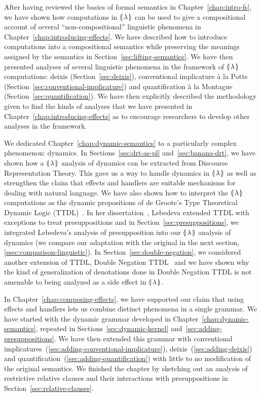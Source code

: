 After having reviewed the basics of formal semantics in
Chapter~\ref{chap:intro-fs}, we have shown how computations in ${\llparenthesis \, \lambda \, \rrparenthesis}$ can
be used to give a compositional account of several ``non-compositional''
linguistic phenomena in Chapter~\ref{chap:introducing-effects}. We have
described how to introduce computations into a compositional semantics
while preserving the meanings assigned by the semantics in
Section~\ref{sec:lifting-semantics}. We have then presented analyses of
several linguistic phenomena in the framework of ${\llparenthesis \, \lambda \, \rrparenthesis}$ computations:
deixis (Section~\ref{sec:deixis}), conventional implicature à la Potts
(Section~\ref{sec:conventional-implicature}) and quantification à la
Montague (Section~\ref{sec:quantification}). We have then explicitly
described the methodology given to find the kinds of analyses that we have
presented in Chapter~\ref{chap:introducing-effects} as to encourage
researchers to develop other analyses in the framework.

We dedicated Chapter~\ref{chap:dynamic-semantics} to a particularly complex
phenomenon: dynamics. In Sections~\ref{sec:drt-as-pl}
and~\ref{sec:banana-drt}, we have shown how a ${\llparenthesis \, \lambda \, \rrparenthesis}$ analysis of dynamics
can be extracted from Discourse Representation Theory. This gave us a way
to handle dynamics in ${\llparenthesis \, \lambda \, \rrparenthesis}$ as well as strengthen the claim that effects
and handlers are suitable mechanisms for dealing with natural language. We
have also shown how to interpret the ${\llparenthesis \, \lambda \, \rrparenthesis}$ computations as the dynamic
propositions of de Groote's Type Theoretical Dynamic Logic
(TTDL)~\cite{de2006towards}. In her
dissertation~\cite{lebedeva2012expression}, Lebedeva extended TTDL with
exceptions to treat presuppositions and in
Section~\ref{sec:presuppositions}, we integrated Lebedeva's analysis of
presupposition into our ${\llparenthesis \, \lambda \, \rrparenthesis}$ analysis of dynamics (we compare our
adaptation with the original in the next section,
\ref{ssec:comparison-linguistic}). In Section~\ref{sec:double-negation}, we
considered another extension of TTDL, Double Negation
TTDL~\cite{qian2014accessibility} and we have shown why the kind of
generalization of denotations done in Double Negation TTDL is not amenable
to being analyzed as a side effect in ${\llparenthesis \, \lambda \, \rrparenthesis}$.

In Chapter~\ref{chap:composing-effects}, we have supported our claim that
using effects and handlers lets us combine distinct phenomena in a single
grammar. We have started with the dynamic grammar developed in
Chapter~\ref{chap:dynamic-semantics}, repeated in
Sections~\ref{sec:dynamic-kernel} and~\ref{sec:adding-presuppositions}. We
have then extended this grammar with conventional
implicatures~(\ref{sec:adding-conventional-implicature}),
deixis~(\ref{sec:adding-deixis}) and
quantification~(\ref{sec:adding-quantification}) with little to no
modification of the original semantics. We finished the chapter by
sketching out an analysis of restrictive relative clauses and their
interactions with presuppositions in Section~\ref{sec:relative-clauses}.



